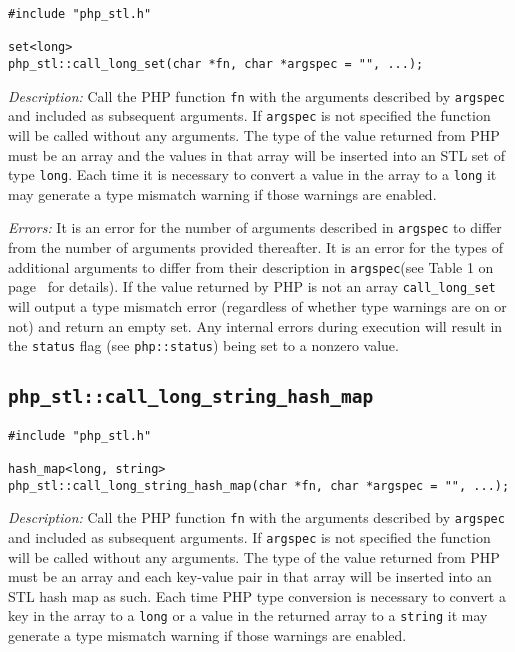 \documentclass[11pt,titlepage]{article}
\begin{document}
\begin{verbatim}
#include "php_stl.h"

set<long> 
php_stl::call_long_set(char *fn, char *argspec = "", ...);
\end{verbatim}

\emph{Description:} Call the PHP function \verb|fn| with the arguments described by \verb|argspec| and included as subsequent arguments. If \verb|argspec| is not specified the function will be called without any arguments. The type of the value returned from PHP must be an array and the values in that array will be inserted into an STL set of type \verb|long|. Each time it is necessary to convert a value in the array to a \verb|long| it may generate a type mismatch warning if those warnings are enabled.

\emph{Errors:} It is an error for the number of arguments described in \verb|argspec| to differ from the number of arguments provided thereafter. It is an error for the types of additional arguments to differ from their description in \verb|argspec|(see Table 1 on page~\pageref{Table1} for details). If the value returned by PHP is not an array \verb|call_long_set| will output a type mismatch error (regardless of whether type warnings are on or not) and return an empty set. Any internal errors during execution will result in the \verb|status| flag (see \verb|php::status|) being set to a nonzero value.


\subsection{\texttt{php\_stl::call\_long\_string\_hash\_map}}

\begin{verbatim}
#include "php_stl.h"

hash_map<long, string> 
php_stl::call_long_string_hash_map(char *fn, char *argspec = "", ...);
\end{verbatim}

\emph{Description:} Call the PHP function \verb|fn| with the arguments described by \verb|argspec| and included as subsequent arguments. If \verb|argspec| is not specified the function will be called without any arguments. The type of the value returned from PHP must be an array and each key-value pair in that array will be inserted into an STL hash map as such. Each time PHP type conversion is necessary to convert a key in the array to a \verb|long| or a value in the returned array to a \verb|string| it may generate a type mismatch warning if those warnings are enabled.
\end{document}
